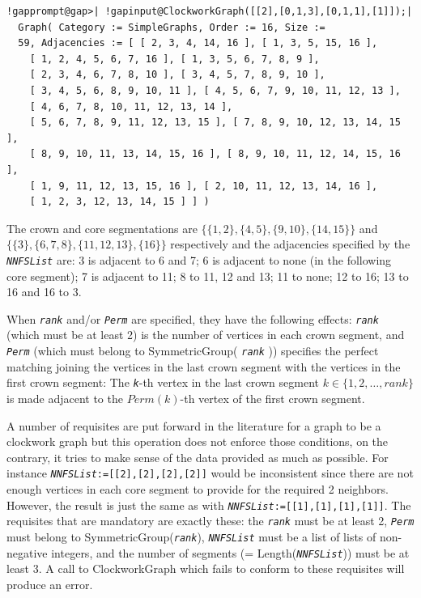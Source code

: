 \documentclass[a4paper,11pt]{report}
\begin{document}
{{{ 
\begin{Verbatim}[commandchars=!@|,fontsize=\small,frame=single,label=Example]
  !gapprompt@gap>| !gapinput@ClockworkGraph([[2],[0,1,3],[0,1,1],[1]]);|
  Graph( Category := SimpleGraphs, Order := 16, Size := 
  59, Adjacencies := [ [ 2, 3, 4, 14, 16 ], [ 1, 3, 5, 15, 16 ], 
    [ 1, 2, 4, 5, 6, 7, 16 ], [ 1, 3, 5, 6, 7, 8, 9 ], 
    [ 2, 3, 4, 6, 7, 8, 10 ], [ 3, 4, 5, 7, 8, 9, 10 ], 
    [ 3, 4, 5, 6, 8, 9, 10, 11 ], [ 4, 5, 6, 7, 9, 10, 11, 12, 13 ], 
    [ 4, 6, 7, 8, 10, 11, 12, 13, 14 ], 
    [ 5, 6, 7, 8, 9, 11, 12, 13, 15 ], [ 7, 8, 9, 10, 12, 13, 14, 15 ], 
    [ 8, 9, 10, 11, 13, 14, 15, 16 ], [ 8, 9, 10, 11, 12, 14, 15, 16 ], 
    [ 1, 9, 11, 12, 13, 15, 16 ], [ 2, 10, 11, 12, 13, 14, 16 ], 
    [ 1, 2, 3, 12, 13, 14, 15 ] ] )
\end{Verbatim}
 

The crown and core segmentations are $\{\{1,2\},\{4,5\},\{9,10\},\{14,15\}\}$ and $\{\{3\},\{6,7,8\},\{11,12,13\},\{16\}\}$ respectively and the adjacencies specified by the \mbox{\texttt{\mdseries\slshape NNFSList}} are: 3 is adjacent to 6 and 7; 6 is adjacent to none (in the following core
segment); 7 is adjacent to 11; 8 to 11, 12 and 13; 11 to none; 12 to 16; 13 to
16 and 16 to 3. 

When \mbox{\texttt{\mdseries\slshape rank}} and/or \mbox{\texttt{\mdseries\slshape Perm}} are specified, they have the following effects: \mbox{\texttt{\mdseries\slshape rank}} (which must be at least 2) is the number of vertices in each crown segment,
and \mbox{\texttt{\mdseries\slshape Perm}} (which must belong to SymmetricGroup( \mbox{\texttt{\mdseries\slshape rank}} )) specifies the perfect matching joining the vertices in the last crown
segment with the vertices in the first crown segment: The \mbox{\texttt{\mdseries\slshape k}}-th vertex in the last crown segment $k\in \{1,2,\ldots,rank\}$ is made adjacent to the $Perm(k)$-th vertex of the first crown segment. 

A number of requisites are put forward in the literature for a graph to be a
clockwork graph but this operation does not enforce those conditions, on the
contrary, it tries to make sense of the data provided as much as possible. For
instance \texttt{\mbox{\texttt{\mdseries\slshape NNFSList}}:=[[2],[2],[2],[2]]} would be inconsistent since there are not enough vertices in each core segment
to provide for the required 2 neighbors. However, the result is just the same
as with \texttt{\mbox{\texttt{\mdseries\slshape NNFSList}}:=[[1],[1],[1],[1]]}. The requisites that are mandatory are exactly these: the \mbox{\texttt{\mdseries\slshape rank}} must be at least 2, \mbox{\texttt{\mdseries\slshape Perm}} must belong to SymmetricGroup(\mbox{\texttt{\mdseries\slshape rank}}), \mbox{\texttt{\mdseries\slshape NNFSList}} must be a list of lists of non-negative integers, and the number of segments
(= Length(\mbox{\texttt{\mdseries\slshape NNFSList}})) must be at least 3. A call to ClockworkGraph which fails to conform to
these requisites will produce an error. }

}}
\end{document}
